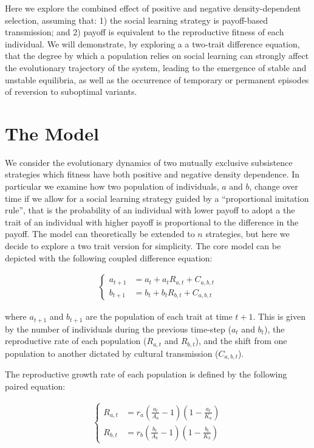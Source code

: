 \documentclass[preprint,authoryear]{elsarticle}
\begin{document}
Here we explore the combined effect of positive and negative density-dependent selection, assuming that: 1) the social learning strategy is payoff-based transmission; and 2)  payoff is equivalent to the reproductive fitness of each individual. We will demonstrate, by exploring a a two-trait difference equation, that the degree by which a population relies on social learning can strongly affect the evolutionary trajectory of the system, leading to the emergence of stable and unstable equilibria, as well as the occurrence of temporary or permanent episodes of reversion to suboptimal variants. 


\section{The Model}
We consider the evolutionary dynamics of two mutually exclusive subsistence strategies which fitness have both positive and negative density dependence. In particular we examine how two population of individuals, $a$ and $b$, change over time if we allow for a social learning strategy guided by a ``proportional imitation rule'', that is the probability of an individual with lower payoff to adopt a the trait of an individual with higher payoff is proportional to the difference in the payoff. The model can theoretically be extended to $n$ strategies, but here we decide to explore a two trait version for simplicity. The core model can be depicted with the following coupled difference equation:

\begin{align}
\label{eq1}
\begin{cases}
a_{t+1}& = a_t + a_t R_{a,t} + C_{a,b,t} \\
b_{t+1}& = b_t + b_t R_{b,t} + C_{a,b,t}
\end{cases}
\end{align}

where $a_{t+1}$ and $b_{t+1}$ are the population of each trait at time $t+1$. This is given by the number of individuals during the previous time-step ($a_t$ and $b_t$), the reproductive rate of each population ($R_{a,t}$ and $R_{b,t}$), and the shift from one population to another dictated by cultural transmission ($C_{a,b,t}$). 

The reproductive growth rate of each population is defined by the following paired equation:

\begin{align}
\label{eq2}
\begin{cases}
R_{a,t}& = r_a (\frac{a_t}{A_a}-1)(1-\frac{a_t}{K_a})\\
R_{b,t}& = r_b (\frac{b_t}{A_b}-1)(1-\frac{b_t}{K_b}) 
\end{cases}
\end{align}
\end{document}
